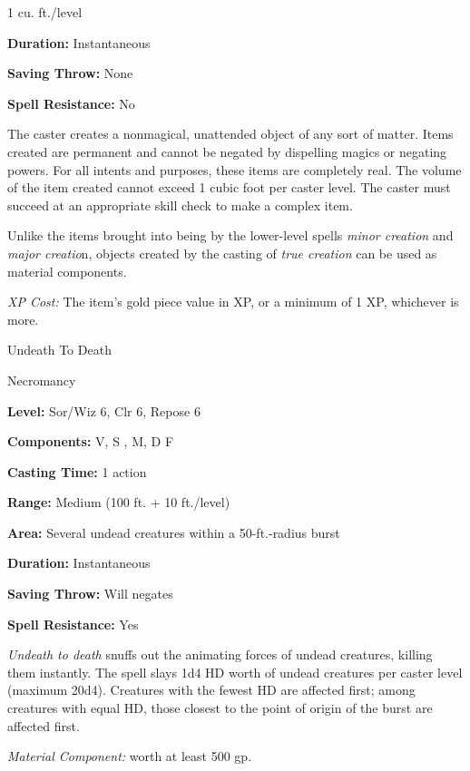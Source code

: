 \documentclass{article}
\begin{document}
1 cu. ft./level

\textbf{Duration:} Instantaneous

\textbf{Saving Throw:} None

\textbf{Spell Resistance:} No

The caster creates a nonmagical, unattended object of any sort of matter. Items 
created are permanent and cannot be negated by dispelling magics or negating powers. 
For all intents and purposes, these items are completely real. The volume of the 
item created cannot exceed 1 cubic foot per caster level. The caster must succeed 
at an appropriate skill check to make a complex item.

Unlike the items brought into being by the lower-level spells \textit{minor creation 
}and \textit{major creatio}n, objects created by the casting of \textit{true creation 
}can be used as material components.

\textit{XP Cost: }The item's gold piece value in XP, or a minimum of 1 XP, whichever 
is more.

\vspace{12pt}
Undeath To Death

Necromancy

\textbf{Level:} Sor/Wiz 6, Clr 6, Repose 6

\textbf{Components:} V, S , M, D F

\textbf{Casting Time:} 1 action

\textbf{Range:} Medium (100 ft. + 10 ft./level)

\textbf{Area:} Several undead creatures within a 50-ft.-radius burst

\textbf{Duration:} Instantaneous

\textbf{Saving Throw:} Will negates

\textbf{Spell Resistance:} Yes

\textit{Undeath to death }snuffs out the animating forces of undead creatures, 
killing them instantly. The spell slays 1d4 HD worth of undead creatures per caster 
level (maximum 20d4). Creatures with the fewest HD are affected first; among creatures 
with equal HD, those closest to the point of origin of the burst are affected first.

\textit{Material Component: }worth at least 500 gp.

\newpage
\end{document}

